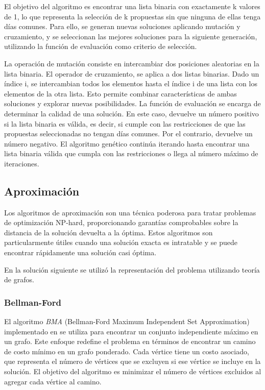 \documentclass[10pt]{article} %
\begin{document}
	El objetivo del algoritmo es encontrar una lista binaria con exactamente k valores de 1, lo que representa la selección de k propuestas sin que ninguna de ellas tenga días comunes. Para ello, se generan nuevas soluciones aplicando mutación y cruzamiento, y se seleccionan las mejores soluciones para la siguiente generación, utilizando la función de evaluación como criterio de selección. 
	
	La operación de mutación consiste en intercambiar dos posiciones aleatorias en la lista binaria. El operador de cruzamiento, se aplica a dos listas binarias. Dado un índice i, se intercambian todos los elementos hasta el índice i de una lista con los elementos de la otra lista. Esto permite combinar características de ambas soluciones y explorar nuevas posibilidades. La función de evaluación se encarga de determinar la calidad de una solución. En este caso, devuelve un número positivo si la lista binaria es válida, es decir, si cumple con las restricciones de que las propuestas seleccionadas no tengan días comunes. Por el contrario, devuelve un número negativo.  El algoritmo genético continúa iterando hasta encontrar una lista binaria válida que cumpla con las restricciones o llega al n\'umero m\'aximo de iteraciones.
	
	\subsection{Aproximaci\'on}

	Los algoritmos de aproximación son una técnica poderosa para tratar problemas de optimización NP-hard, proporcionando garantías comprobables sobre la distancia de la solución devuelta a la óptima. Estos algoritmos son particularmente útiles cuando una solución exacta es intratable y se puede encontrar rápidamente una solución casi óptima.
	
	En la soluci\'on siguiente se utiliz\'o la representaci\'on del problema utilizando teor\'ia de grafos.
	
	\subsubsection{Bellman-Ford} 
	
	El algoritmo \textit{BMA} (Bellman-Ford Maximum Independent Set Approximation) implementado en \cite{bellman-ford}  se utiliza para encontrar un conjunto independiente máximo en un grafo. Este enfoque redefine el problema en términos de encontrar un camino de costo mínimo en un grafo ponderado. Cada vértice tiene un costo asociado, que representa el número de vértices que se excluyen si ese vértice se incluye en la solución. El objetivo del algoritmo es minimizar el número de vértices excluidos al agregar cada vértice al camino.
	
\end{document}
